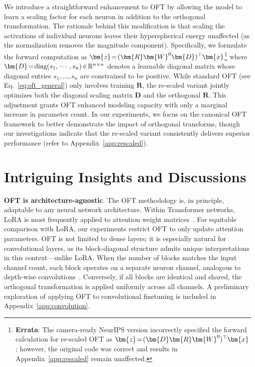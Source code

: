 We introduce a straightforward enhancement to OFT by allowing the model to learn a scaling factor for each neuron in addition to the orthogonal transformation. The rationale behind this modification is that scaling the activations of individual neurons leaves their hyperspherical energy unaffected (as the normalization removes the magnitude component). Specifically, we formulate the forward computation as $\thickmuskip=2mu \medmuskip=2mu\bm{z}=(\bm{R}\bm{W}^0\bm{D})^\top\bm{x}$\footnote{\textbf{Errata}: The camera-ready NeurIPS version incorrectly specified the forward calculation for re-scaled OFT as $\thickmuskip=2mu \medmuskip=2mu\bm{z}=(\bm{D}\bm{R}\bm{W}^0)^\top\bm{x}$; however, the original code was correct and results in Appendix~\ref{app:rescaled} remain unaffected.} where $\thickmuskip=2mu \medmuskip=2mu \bm{D}=\text{diag}(s_1,\cdots,s_n)\in\mathbb{R}^{n\times n}$ denotes a learnable diagonal matrix whose diagonal entries $s_1,\ldots,s_n$ are constrained to be positive. While standard OFT (see Eq.~\eqref{eq:oft_general}) only involves training $\bm{R}$, the re-scaled variant jointly optimizes both the diagonal scaling matrix $\bm{D}$ and the orthogonal $\bm{R}$. This adjustment grants OFT enhanced modeling capacity with only a marginal increase in parameter count. In our experiments, we focus on the canonical OFT framework to better demonstrate the impact of orthogonal transforms, though our investigations indicate that the re-scaled variant consistently delivers superior performance (refer to Appendix~\ref{app:rescaled}).

\section{Intriguing Insights and Discussions}

\textbf{OFT is architecture-agnostic}. The OFT methodology is, in principle, adaptable to any neural network architecture. Within Transformer networks, LoRA is most frequently applied to attention weight matrices~\cite{hulora2022}. For equitable comparison with LoRA, our experiments restrict OFT to only update attention parameters. OFT is not limited to dense layers; it is especially natural for convolutional layers, as its block-diagonal structure admits unique interpretations in this context—unlike LoRA. When the number of blocks matches the input channel count, each block operates on a separate neuron channel, analogous to depth-wise convolutions~\cite{chollet2017xception}. Conversely, if all blocks are identical and shared, the orthogonal transformation is applied uniformly across all channels. A preliminary exploration of applying OFT to convolutional finetuning is included in Appendix~\ref{app:convolution}.

